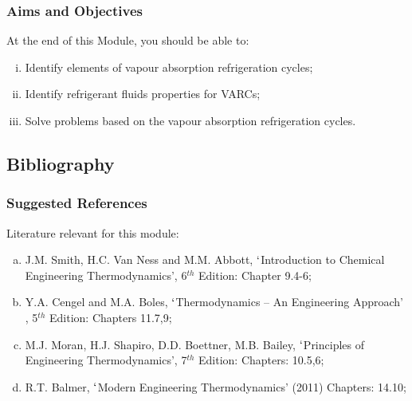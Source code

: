 \documentclass[10pt,compress]{beamer}
\begin{document}
\begin{frame}
 \frametitle{Aims and Objectives}
  At the end of this Module, you should be able to:
  \begin{enumerate}[(i)]
   \item <1-> Identify elements of vapour absorption refrigeration cycles;
   \item <2-> Identify refrigerant fluids properties for VARCs;
   \item <3-> Solve problems based on the vapour absorption refrigeration cycles.
  \end{enumerate}
\end{frame}


\subsection{Bibliography} 
\begin{frame}
 \frametitle{Suggested References}
  Literature relevant for this module:
  \begin{enumerate}[(a)]
   \item J.M. Smith, H.C. Van Ness and M.M. Abbott, $\lq$Introduction to Chemical Engineering Thermodynamics', 6$^{th}$ Edition: Chapter 9.4-6;
   \item Y.A. Cengel and M.A. Boles, $\lq$Thermodynamics -- An Engineering Approach' , 5$^{th}$ Edition: Chapters 11.7,9;
   \item M.J. Moran, H.J. Shapiro, D.D. Boettner, M.B. Bailey, $\lq$Principles of Engineering Thermodynamics', 7$^{th}$ Edition: Chapters: 10.5,6;
   \item R.T. Balmer, $\lq$Modern Engineering Thermodynamics' (2011) Chapters: 14.10;
  \end{enumerate}
\end{frame}
\end{document}
